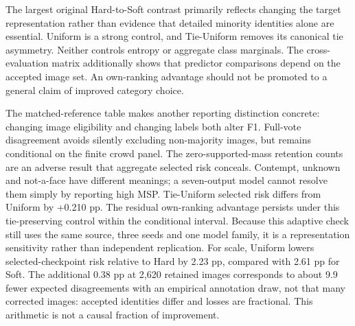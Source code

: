 The largest original Hard-to-Soft contrast primarily reflects changing the target representation rather than evidence that detailed minority identities alone are essential. Uniform is a strong control, and Tie-Uniform removes its canonical tie asymmetry. Neither controls entropy or aggregate class marginals. The cross-evaluation matrix additionally shows that predictor comparisons depend on the accepted image set. An own-ranking advantage should not be promoted to a general claim of improved category choice.

The matched-reference table makes another reporting distinction concrete: changing image eligibility and changing labels both alter F1. Full-vote disagreement avoids silently excluding non-majority images, but remains conditional on the finite crowd panel. The zero-supported-mass retention counts are an adverse result that aggregate selected risk conceals. Contempt, unknown and not-a-face have different meanings; a seven-output model cannot resolve them simply by reporting high MSP.
Tie-Uniform selected risk differs from Uniform by +0.210 pp. The residual own-ranking advantage persists under this tie-preserving control within the conditional interval. Because this adaptive check still uses the same source, three seeds and one model family, it is a representation sensitivity rather than independent replication.
For scale, Uniform lowers selected-checkpoint risk relative to Hard by 2.23 pp, compared with 2.61 pp for Soft. The additional 0.38 pp at 2,620 retained images corresponds to about 9.9 fewer expected disagreements with an empirical annotation draw, not that many corrected images: accepted identities differ and losses are fractional. This arithmetic is not a causal fraction of improvement.
